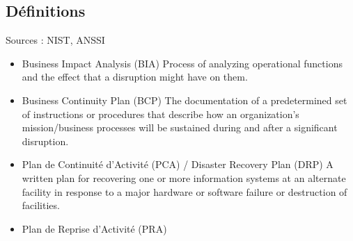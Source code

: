 \subsection{Définitions}
Sources : NIST, ANSSI
\begin{itemize}
    \item Business Impact Analysis (BIA)
    Process of analyzing operational functions and the effect that a disruption might have on them.
    \item Business Continuity Plan (BCP)
    The documentation of a predetermined set of instructions or procedures that describe how an organization’s mission/business processes will be sustained during and after a significant disruption.
    \item Plan de Continuité d'Activité (PCA) / Disaster Recovery Plan (DRP)
     A written plan for recovering one or more information systems at an alternate facility in response to a major hardware or software failure or destruction of facilities.
    \item Plan de Reprise d'Activité (PRA)
\end{itemize}





